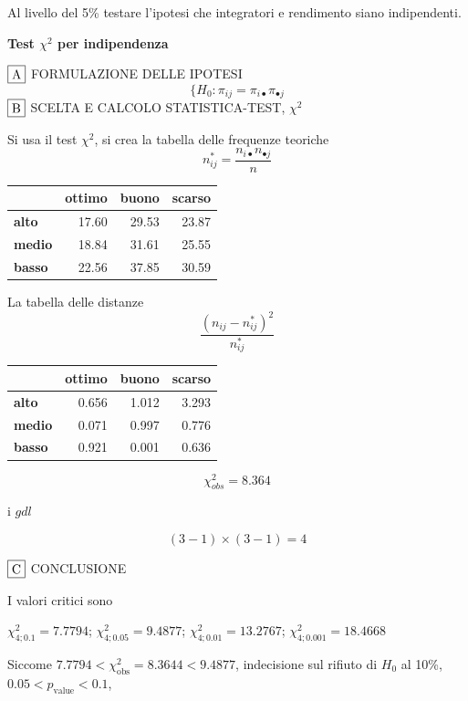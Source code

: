 \documentclass[
  11pt,
]{book}
\theoremstyle{mytheoremstyle}
\theoremstyle{mydefstyle}
\newenvironment{sol}
  {
  \begin{tcolorbox}[enhanced,breakable,arc=0.1mm,boxrule=1pt,colback=white,colframe=iblue,
  title=\bf \fontfamily{lmss}\selectfont \hspace{.5 cm} Soluzione,drop fuzzy shadow]

}{
\end{tcolorbox}
  }
\begin{document}
Al livello del 5\% testare l'ipotesi che integratori e rendimento siano indipendenti.

\begin{sol}
\textbf{Test \(\chi^2\) per indipendenza}

\(\fbox{A}\) FORMULAZIONE DELLE IPOTESI
\[
\Big\{H_0:\pi_{ij}=\pi_{i\bullet}\pi_{\bullet j}
\]
\(\fbox{B}\) SCELTA E CALCOLO STATISTICA-TEST, \(\chi^2\)

Si usa il test \(\chi^2\), si crea la tabella delle frequenze teoriche
\[
n_{ij}^*=\frac{n_{i\bullet}n_{\bullet j}}{n}
\]

\begin{table}[H]
\centering
\begin{tabular}{>{}lrrr}
\toprule
  & ottimo & buono & scarso\\
\midrule
\textbf{alto} & 17.60 & 29.53 & 23.87\\
\textbf{medio} & 18.84 & 31.61 & 25.55\\
\textbf{basso} & 22.56 & 37.85 & 30.59\\
\bottomrule
\end{tabular}
\end{table}

La tabella delle distanze
\[
\frac{(n_{ij}-n_{ij}^*)^2}{n_{ij}^*}
\]

\begin{table}[H]
\centering
\begin{tabular}{>{}lrrr}
\toprule
  & ottimo & buono & scarso\\
\midrule
\textbf{alto} & 0.656 & 1.012 & 3.293\\
\textbf{medio} & 0.071 & 0.997 & 0.776\\
\textbf{basso} & 0.921 & 0.001 & 0.636\\
\bottomrule
\end{tabular}
\end{table}

\[
    \chi^2_{obs}= 8.364 
  \]

i \(gdl\)

\[
    ( 3 -1)\times( 3 -1)= 4 
  \]

\(\fbox{C}\) CONCLUSIONE

I valori critici sono

\(\chi^2_{4;0.1}=7.7794\); \(\chi^2_{4;0.05}=9.4877\); \(\chi^2_{4;0.01}=13.2767\); \(\chi^2_{4;0.001}=18.4668\)

Siccome \(7.7794<\chi^2_\text{obs}=8.3644<9.4877\), indecisione sul rifiuto di \(H_0\) al 10\%, \(0.05<p_\text{value}<0.1\),


\end{sol}
\end{document}
